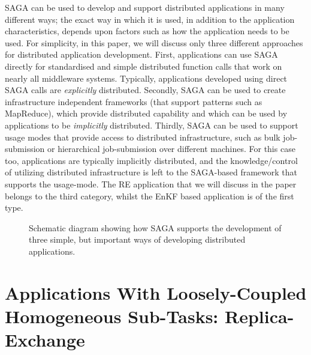 \documentclass{llncs}
\begin{document}
SAGA can be used to develop and support distributed applications in
many different ways; the exact way in which it is used, in addition to
the application characteristics, depends upon factors such as how the
application needs to be used. For simplicity, in this paper, we will
discuss only three different approaches for distributed application
development.  First, applications can use SAGA directly for
standardised and simple distributed function calls that work on nearly
all middleware systems. Typically, applications developed using direct
SAGA calls are {\it explicitly} distributed.  Secondly, SAGA can be
used to create infrastructure independent frameworks (that support
patterns such as MapReduce), which provide distributed capability and
which can be used by applications to be {\it implicitly}
distributed. Thirdly, SAGA can be used to support usage modes that
provide access to distributed infrastructure, such as bulk
job-submission or hierarchical job-submission over different
machines. For this case too, applications are typically implicitly
distributed, and the knowledge/control of utilizing distributed
infrastructure is left to the SAGA-based framework that supports the
usage-mode. The RE application that we will discuss in the paper
belongs to the third category, whilst the EnKF based application is of
the first type.

\up
\begin{figure}[!h]
  \begin{center}
  \end{center}
  \caption{Schematic diagram showing how SAGA supports the development
    of three simple, but important ways of developing distributed
    applications. \up \up}
  \label{sagalayer}
\end{figure}


\section{Applications With Loosely-Coupled Homogeneous
  Sub-Tasks: Replica-Exchange}  
\up 
{}
  
\end{document}
